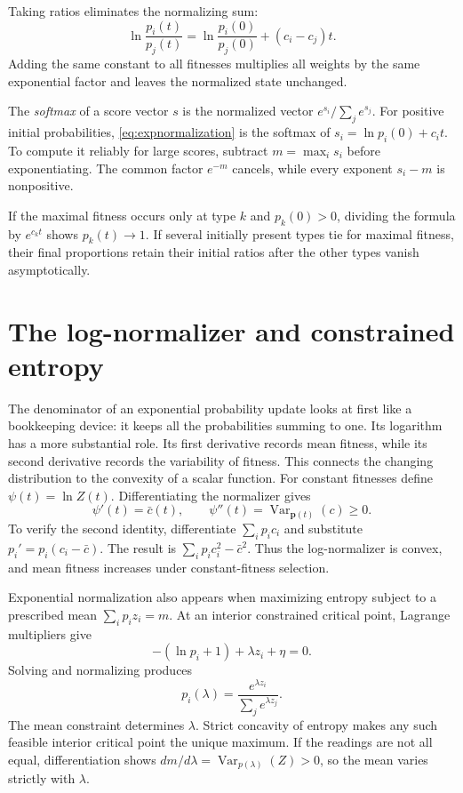 \documentclass[11pt,oneside,openany]{book}
\theoremstyle{definition}
\theoremstyle{remark}
\newcommand{\Var}{\operatorname{Var}}
\newcommand{\p}{\mathbf{p}}
\numberwithin{equation}{chapter}
\begin{document}
Taking ratios eliminates the normalizing sum:
\[
\ln\frac{p_i(t)}{p_j(t)}=\ln\frac{p_i(0)}{p_j(0)}+(c_i-c_j)t.
\]
Adding the same constant to all fitnesses multiplies all weights by the same exponential factor and leaves the normalized state unchanged.

The \emph{softmax} of a score vector $s$ is the normalized vector $e^{s_i}/\sum_je^{s_j}$. For positive initial probabilities, \eqref{eq:expnormalization} is the softmax of $s_i=\ln p_i(0)+c_it$. To compute it reliably for large scores, subtract $m=\max_i s_i$ before exponentiating. The common factor $e^{-m}$ cancels, while every exponent $s_i-m$ is nonpositive.

If the maximal fitness occurs only at type $k$ and $p_k(0)>0$, dividing the formula by $e^{c_kt}$ shows $p_k(t)\to1$. If several initially present types tie for maximal fitness, their final proportions retain their initial ratios after the other types vanish asymptotically.

\section{The log-normalizer and constrained entropy}
The denominator of an exponential probability update looks at first like a bookkeeping device: it keeps all the probabilities summing to one. Its logarithm has a more substantial role. Its first derivative records mean fitness, while its second derivative records the variability of fitness. This connects the changing distribution to the convexity of a scalar function.
For constant fitnesses define $\psi(t)=\ln Z(t)$. Differentiating the normalizer gives
\begin{equation}\label{eq:logpartition}
\psi'(t)=\bar c(t),\qquad
\psi''(t)=\Var_{\p(t)}(c)\geq0.
\end{equation}
To verify the second identity, differentiate $\sum_i p_ic_i$ and substitute $p_i'=p_i(c_i-\bar c)$. The result is $\sum_i p_ic_i^2-\bar c^2$. Thus the log-normalizer is convex, and mean fitness increases under constant-fitness selection.

Exponential normalization also appears when maximizing entropy subject to a prescribed mean $\sum_i p_i z_i=m$. At an interior constrained critical point, Lagrange multipliers give
\[
-(\ln p_i+1)+\lambda z_i+\eta=0.
\]
Solving and normalizing produces
\begin{equation}\label{eq:maxent}
p_i(\lambda)=\frac{e^{\lambda z_i}}{\sum_je^{\lambda z_j}}.
\end{equation}
The mean constraint determines $\lambda$. Strict concavity of entropy makes any such feasible interior critical point the unique maximum. If the readings are not all equal, differentiation shows $dm/d\lambda=\Var_{p(\lambda)}(Z)>0$, so the mean varies strictly with $\lambda$.
\end{document}
